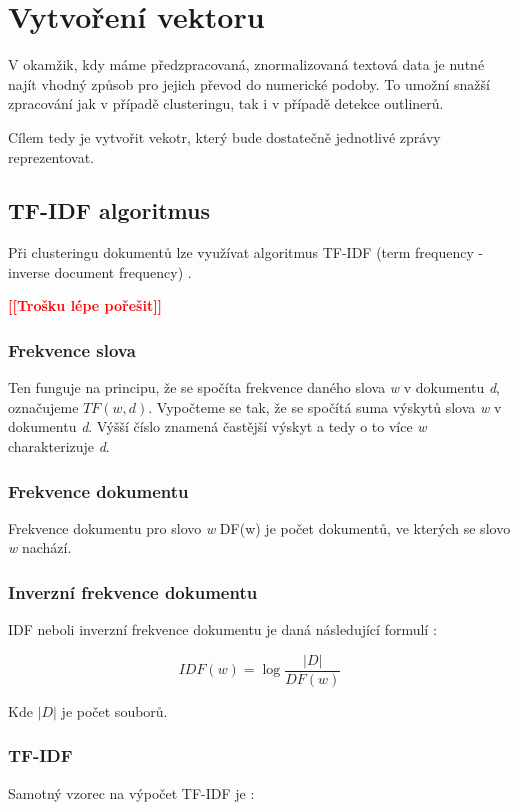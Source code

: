 \documentclass[thesis=M,czech]{FITthesis}[2012/10/20]
\newcommand{\todo}[1]{\textcolor{red}{\textbf{[[#1]]}}}
\begin{document}
	\section{Vytvoření vektoru}
		\label{sec:construct_vector}
		V okamžik, kdy máme předzpracovaná, znormalizovaná textová data je nutné najít vhodný způsob pro jejich převod do numerické podoby. To umožní snažší zpracování jak v případě clusteringu, tak i v případě detekce outlinerů.
		
		Cílem tedy je vytvořit vekotr, který bude dostatečně jednotlivé zprávy reprezentovat.
		
		\subsection{TF-IDF algoritmus}
		\label{subsec:tf-idf}
		Při clusteringu dokumentů lze využívat algoritmus TF-IDF (term frequency - inverse document frequency) \cite{Neto_0}. 
		
		\todo{Trošku lépe pořešit}
		\subsubsection{Frekvence slova}
		Ten funguje na principu, že se spočíta frekvence daného slova \textit{w} v dokumentu \textit{d}, označujeme $TF(w,d)$. Vypočteme se tak, že se spočítá suma výskytů slova \textit{w} v dokumentu \textit{d}. Výšší číslo znamená častější výskyt a tedy o to více \textit{w} charakterizuje \textit{d}.
		
		\subsubsection{Frekvence dokumentu}
		Frekvence dokumentu pro slovo \textit{w} DF(w) je počet dokumentů, ve kterých se slovo \textit{w} nachází.
		
		\subsubsection{Inverzní frekvence dokumentu}
		IDF neboli inverzní frekvence dokumentu je daná následující formulí \cite{Ramos_0}:
		
		$$ IDF(w) = \log{\frac{|D|}{DF(w)}}$$  
		
		Kde $|D|$ je počet souborů.
		
		\subsubsection{TF-IDF}
		Samotný vzorec na výpočet TF-IDF je \cite{Neto_0}: 
		
\end{document}
